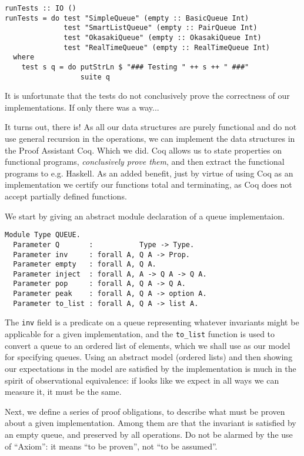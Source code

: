 \documentclass[a4paper, 12pt]{article}
\begin{document}
\begin{lstlisting}
runTests :: IO ()
runTests = do test "SimpleQueue" (empty :: BasicQueue Int)
              test "SmartListQueue" (empty :: PairQueue Int)
              test "OkasakiQueue" (empty :: OkasakiQueue Int)
              test "RealTimeQueue" (empty :: RealTimeQueue Int)
  where
    test s q = do putStrLn $ "### Testing " ++ s ++ " ###"
                  suite q
\end{lstlisting}

It is unfortunate that the tests do not conclusively prove the
correctness of our implementations. If only there was a way...

It turns out, there is! As all our data structures are purely
functional and do not use general recursion in the operations, we can
implement the data structures in the Proof Assistant Coq. Which we
did. Coq allows us to state properties on functional programs,
\emph{conclusively prove them}, and then extract the functional
programs to e.g. Haskell. As an added benefit, just by virtue of using
Coq as an implementation we certify our functions total and
terminating, as Coq does not accept partially defined functions.

We start by giving an abstract module declaration of a queue
implementaion.

\begin{lstlisting}
Module Type QUEUE.
  Parameter Q       :           Type -> Type. 
  Parameter inv     : forall A, Q A -> Prop.
  Parameter empty   : forall A, Q A.
  Parameter inject  : forall A, A -> Q A -> Q A.
  Parameter pop     : forall A, Q A -> Q A.
  Parameter peak    : forall A, Q A -> option A.  
  Parameter to_list : forall A, Q A -> list A.
\end{lstlisting}

The \lstinline{inv} field is a predicate on a queue representing
whatever invariants might be applicable for a given implementation,
and the \lstinline{to_list} function is used to convert a queue to an
ordered list of elements, which we shall use as our model for
specifying queues. Using an abstract model (ordered lists) and then
showing our expectations in the model are satisfied by the
implementation is much in the spirit of observational equivalence: if
looks like we expect in all ways we can measure it, it must be the same.

Next, we define a series of proof obligations, to describe what must
be proven about a given implementation. Among them are that the
invariant is satisfied by an empty queue, and preserved by all
operations. Do not be alarmed by the use of ``Axiom'': it means ``to
be proven'', not ``to be assumed''.
\end{document}
